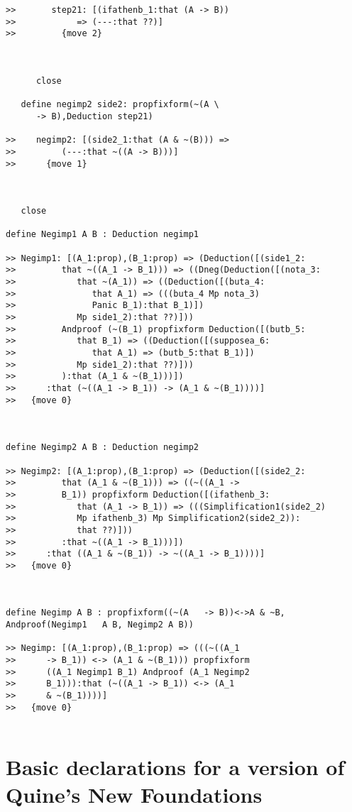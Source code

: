 \documentclass[12pt]{article}
\begin{document}
\begin{verbatim}
>>       step21: [(ifathenb_1:that (A -> B))
>>            => (---:that ??)]
>>         {move 2}



      close

   define negimp2 side2: propfixform(~(A \
      -> B),Deduction step21)

>>    negimp2: [(side2_1:that (A & ~(B))) =>
>>         (---:that ~((A -> B)))]
>>      {move 1}



   close

define Negimp1 A B : Deduction negimp1

>> Negimp1: [(A_1:prop),(B_1:prop) => (Deduction([(side1_2:
>>         that ~((A_1 -> B_1))) => ((Dneg(Deduction([(nota_3:
>>            that ~(A_1)) => ((Deduction([(buta_4:
>>               that A_1) => (((buta_4 Mp nota_3)
>>               Panic B_1):that B_1)])
>>            Mp side1_2):that ??)]))
>>         Andproof (~(B_1) propfixform Deduction([(butb_5:
>>            that B_1) => ((Deduction([(supposea_6:
>>               that A_1) => (butb_5:that B_1)])
>>            Mp side1_2):that ??)]))
>>         ):that (A_1 & ~(B_1)))])
>>      :that (~((A_1 -> B_1)) -> (A_1 & ~(B_1))))]
>>   {move 0}



define Negimp2 A B : Deduction negimp2

>> Negimp2: [(A_1:prop),(B_1:prop) => (Deduction([(side2_2:
>>         that (A_1 & ~(B_1))) => ((~((A_1 ->
>>         B_1)) propfixform Deduction([(ifathenb_3:
>>            that (A_1 -> B_1)) => (((Simplification1(side2_2)
>>            Mp ifathenb_3) Mp Simplification2(side2_2)):
>>            that ??)]))
>>         :that ~((A_1 -> B_1)))])
>>      :that ((A_1 & ~(B_1)) -> ~((A_1 -> B_1))))]
>>   {move 0}



define Negimp A B : propfixform((~(A   -> B))<->A & ~B, Andproof(Negimp1   A B, Negimp2 A B))

>> Negimp: [(A_1:prop),(B_1:prop) => (((~((A_1
>>      -> B_1)) <-> (A_1 & ~(B_1))) propfixform
>>      ((A_1 Negimp1 B_1) Andproof (A_1 Negimp2
>>      B_1))):that (~((A_1 -> B_1)) <-> (A_1
>>      & ~(B_1))))]
>>   {move 0}


\end{verbatim}

\section{Basic declarations for a version of Quine's New Foundations}
\end{document}
